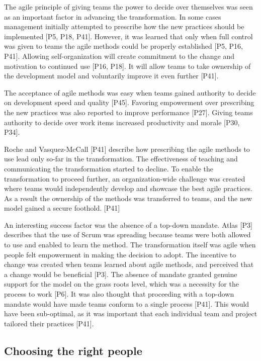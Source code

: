 
The agile principle of giving teams the power to decide over themselves was seen
as an important factor in advancing the transformation.
In some cases management initially attempted to prescribe how the new practices
should be implemented [P5, P18, P41]. However, it was learned that only when
full control was given to teams the agile methods could be properly established
[P5, P16, P41].
Allowing self-organization will create commitment to the change and motivation
to continued use [P16, P18]. It will allow teams to take ownership of the
development model and voluntarily improve it even further [P41].

The acceptance of agile methods was easy when teams gained authority to decide
on development speed and quality [P45]. Favoring empowerment over prescribing
the new practices was also reported to improve performance [P27]. Giving teams
authority to decide over work items increased productivity and morale [P30,
P34].

Roche and Vasquez-McCall [P41] describe how prescribing the agile methods to use
lead only so-far in the transformation. The effectiveness of teaching and
communicating the transformation started to decline. To enable the
transformation to proceed further, an organization-wide challenge was created
where teams would independently develop and showcase the best agile practices.
As a result the ownership of the methods was transferred to teams, and the new
model gained a secure foothold. [P41]


An interesting success factor was the absence of a top-down mandate. Atlas [P3]
describes that the use of Scrum was spreading because teams were both allowed to
use and enabled to learn the method. The transformation itself was agile when
people felt empowerment in making the decision to adopt. The incentive to change
was created when teams learned about agile methods, and perceived that a change
would be beneficial [P3].
The absence of mandate granted genuine support for the model on the grass roots
level, which was a necessity for the process to work [P6].
It was also thought that proceeding with a top-down mandate would have made
teams conform to a single process [P41]. This would have been sub-optimal, as it
was important that each individual team and project tailored their practices
[P41].


\subsection{Choosing the right people}

